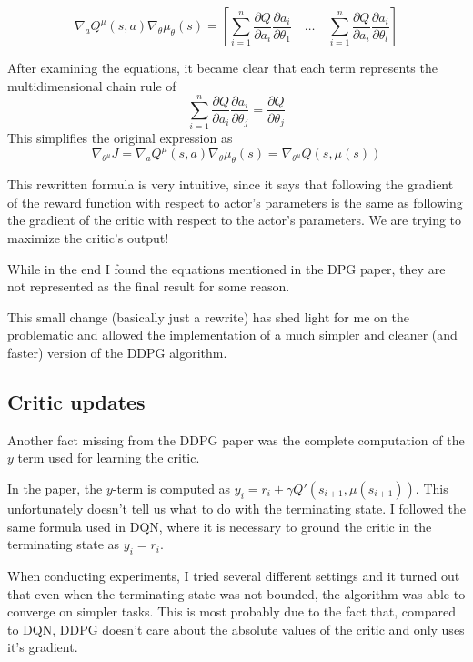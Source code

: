\[ 
\nabla_aQ^\mu(s,a)\nabla_\theta \mu_\theta(s)=\left[ \sum_{i=1}^n \dfrac{\partial Q}{\partial a_i}\dfrac{\partial a_i}{\partial \theta_1}\quad \dots \quad \sum_{i=1}^n \dfrac{\partial Q}{\partial a_i}\dfrac{\partial a_i}{\partial \theta_l}\right]
\]

After examining the equations, it became clear that each term  represents the multidimensional chain rule of 
\[
\sum_{i=1}^n \dfrac{\partial Q}{\partial a_i}\dfrac{\partial a_i}{\partial \theta_j} = \dfrac{\partial Q}{\partial \theta_j}
\]
This simplifies the original expression as
\begin{equation}
\nabla_{\theta^{\mu}} J=\nabla_aQ^\mu(s,a)\nabla_\theta \mu_\theta(s)=\nabla_{\theta^\mu} Q(s, \mu (s))
\end{equation}

This rewritten formula is very intuitive, since it says that following the gradient of the reward function with respect to actor's parameters is the same as following the gradient of the critic with respect to the actor's parameters. We are trying to maximize the critic's output!

While in the end I found the equations mentioned in the DPG paper, they are not represented as the final result for some reason.

This small change (basically just a rewrite) has shed light for me on the problematic and allowed the implementation of a much simpler and cleaner (and faster) version of the DDPG algorithm.


\subsection{Critic updates}
Another fact missing from the DDPG paper was the complete computation of the $y$ term used for learning the critic.

In the paper, the $y$-term is computed as $y_i=r_i + \gamma Q'(s_{i + 1}, \mu(s_{i+1}))$. This unfortunately doesn't tell us what to do with the terminating state. I followed the same formula used in DQN, where it is necessary to ground the critic in the terminating state as $y_i=r_i$.
\medskip

When conducting experiments, I tried several different settings and it turned out that even when the terminating state was not bounded, the algorithm was able to converge on simpler tasks. This is most probably due to the fact that, compared to DQN, DDPG doesn't care about the absolute values of the critic and only uses it's gradient.

